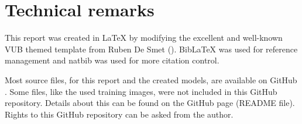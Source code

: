 

\section{Technical remarks}
\label{section:technical_remarks}

This report was created in \LaTeX{} by modifying the excellent and well-known VUB themed template from Ruben De Smet (\citeyear{latex_template}). BibLaTeX was used for reference management and natbib was used for more citation control. 

Most source files, for this report and the created models, are available on GitHub \citep{github_project}. Some files, like the used training images, were not included in this GitHub repository. Details about this can be found on the GitHub page (README file). Rights to this GitHub repository can be asked from the author.